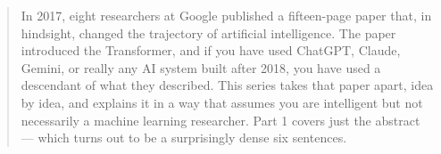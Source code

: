 \begin{abstract}
In 2017, eight researchers at Google published a fifteen-page paper that, in hindsight, changed the trajectory of artificial intelligence.
The paper introduced the Transformer, and if you have used ChatGPT, Claude, Gemini, or really any AI system built after 2018, you have used a descendant of what they described.
This series takes that paper apart, idea by idea, and explains it in a way that assumes you are intelligent but not necessarily a machine learning researcher.
Part 1 covers just the abstract --- which turns out to be a surprisingly dense six sentences.
\end{abstract}
